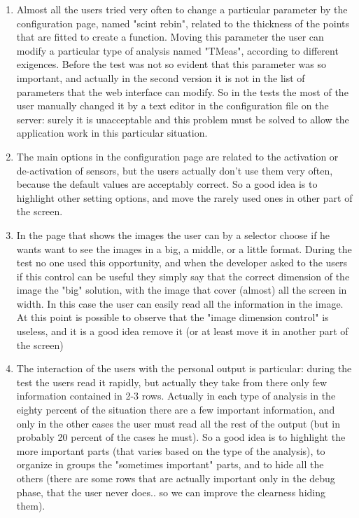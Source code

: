 \begin{enumerate}

\item
Almost all the users tried very often to change a particular parameter by the configuration page, named "scint rebin", related to the thickness of the points that are fitted to create a function. Moving this parameter the user can modify a particular type of analysis named "TMeas", according to different exigences. Before the test was not so evident that this parameter was so important, and actually in the second version it is not in the list of parameters that the web interface can modify. So in the tests the most of the user manually changed it by a text editor in the configuration file on the server: surely it is unacceptable and this problem must be solved to allow the application work in this particular situation.

\item 
The main options in the configuration page are related to the activation or de-activation of sensors, but the users actually don't use them very often, because  the default values are acceptably correct. So a good idea is to highlight other setting options, and move the rarely used ones in other part of the screen.

\item
In the page that shows the images the user can by a selector choose if he wants want to see the images in a big, a middle, or a little format. During the test no one used this opportunity, and when the developer asked to the users if this control can be useful they simply say that the correct dimension of the image the "big" solution, with the image that cover (almost) all the screen in width. In this case the user can easily read all the information in the image. At this point is possible to observe that the "image dimension control" is useless, and it is a good idea remove it (or at least move it in another part of the screen)   

\item
The interaction of the users with the personal output is particular: during the test the users read it rapidly, but actually they take from there only few information contained in 2-3 rows. Actually in each type of analysis in the eighty percent of the situation there are a few important information, and only in the other cases the user must read all the rest of the output (but in probably 20 percent of the cases he must). So a good idea is to highlight the more important parts (that varies based on the type of the analysis), to organize in groups the "sometimes important" parts, and to hide all the others (there are some rows that are actually important only in the debug phase, that the user never does.. so we can improve the clearness hiding them).


\end{enumerate}
